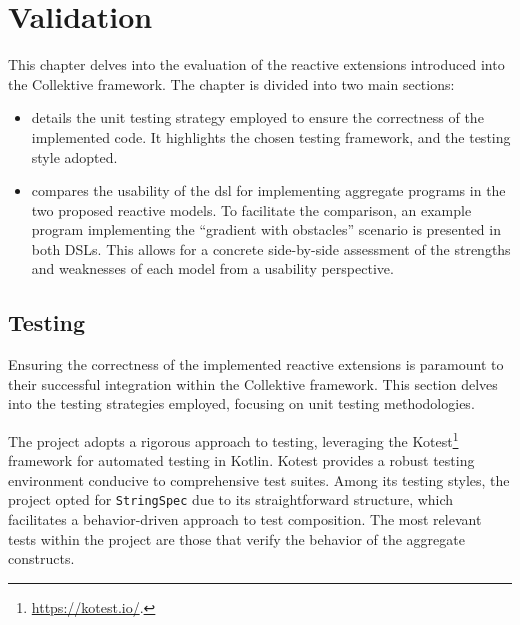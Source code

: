 
\chapter{Validation}
\label{chap:evaluation}

This chapter delves into the evaluation of the reactive extensions introduced into the Collektive framework. The chapter is divided into two main sections:

\begin{itemize}
    \item {} details the unit testing strategy employed to ensure the correctness of the implemented code. It highlights the chosen testing framework, and the testing style adopted.
    \item {} compares the usability of the \ac{dsl} for implementing aggregate programs in the two proposed reactive models. To facilitate the comparison, an example program implementing the ``gradient with obstacles'' scenario is presented in both DSLs. This allows for a concrete side-by-side assessment of the strengths and weaknesses of each model from a usability perspective.
\end{itemize}

\section{Testing}
\label{section:testing}

Ensuring the correctness of the implemented reactive extensions is paramount to their successful integration within the Collektive framework. This section delves into the testing strategies employed, focusing on unit testing methodologies.

The project adopts a rigorous approach to testing, leveraging the Kotest\footnote{\url{https://kotest.io/}.} framework for automated testing in Kotlin. Kotest provides a robust testing environment conducive to comprehensive test suites. Among its testing styles, the project opted for \texttt{StringSpec} due to its straightforward structure, which facilitates a behavior-driven approach to test composition. The most relevant tests within the project are those that verify the behavior of the aggregate constructs.

